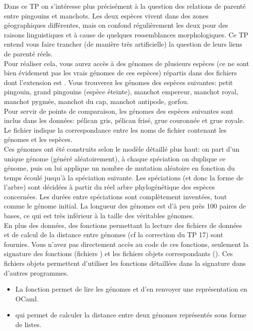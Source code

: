 \documentclass[a4paper, 10pt]{article}
\begin{document}
Dans ce TP on s'intéresse plus précisément à la question des relations de parenté entre pingouins et manchots. Les deux espèces vivent dans des zones géographiques différentes, mais on confond régulièrement les deux pour des raisons linguistiques et à cause de quelques ressemblances morphologiques. Ce TP entend vous faire trancher (de manière très artificielle) la question de leurs liens de parenté réels.\\
Pour réaliser cela, vous aurez accès à des génomes de plusieurs espèces (ce ne sont bien évidement pas les vrais génomes de ces espèces) répartis dans des fichiers dont l'extension est . Vous trouverez les génomes des espèces suivantes: petit pingouin, grand pingouins (espèce éteinte), manchot empereur, manchot royal, manchot pygmée, manchot du cap, manchot antipode, gorfou.\\
Pour servir de points de comparaison, les génomes des espèces suivantes sont inclus dans les données: pélican gris, pélican frisé, grue couronnée et grue royale. Le fichier  indique la correspondance entre les noms de fichier contenant les génomes et les espèces.\\
Ces génomes ont été construits selon le modèle détaillé plus haut: on part d'un unique génome (généré aléatoirement), à chaque spéciation on duplique ce génome, puis on lui applique un nombre de mutation aléatoire en fonction du temps écoulé jusqu'à la spéciation suivante. Les spéciations (et donc la forme de l'arbre) sont décidées à partir du réel arbre phylogénétique des espèces concernées. Les durées entre spéciations sont complètement inventées, tout comme le génome initial.
La longueur des génomes est d'à peu près 100 paires de bases, ce qui est très inférieur à la taille des véritables génomes.\\
En plus des données, des fonctions permettant la lecture des fichiers de données et de calcul de la distance entre génomes (cf la correction du TP 17) sont fournies. Vous n'avez pas directement accès au code de ces fonctions, seulement la signature des fonctions (fichiers ) et les fichiers objets correspondants (). Ces fichiers objets permettent d'utiliser les fonctions détaillées dans la signature dans d'autres programmes.
\begin{itemize}
\item La fonction  permet de lire les génomes et d'en renvoyer une représentation en OCaml.
\item {} qui permet de calculer la distance entre deux génomes représentés sous forme de listes.
\end{itemize}
\end{document}
